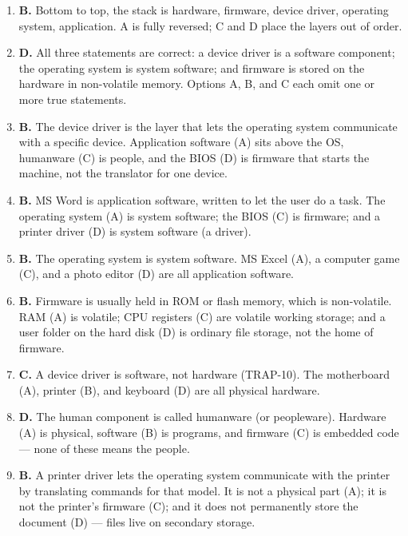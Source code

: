\begin{enumerate}[label=\textbf{Q\arabic*.}, leftmargin=*]
  CPU (hardware).
\item \textbf{B.} Bottom to top, the stack is hardware, firmware, device
  driver, operating system, application. A is fully reversed; C and D place
  the layers out of order.
\item \textbf{D.} All three statements are correct: a device driver is a
  software component; the operating system is system software; and firmware
  is stored on the hardware in non-volatile memory. Options A, B, and C each
  omit one or more true statements.
\item \textbf{B.} The device driver is the layer that lets the operating
  system communicate with a specific device. Application software (A) sits
  above the OS, humanware (C) is people, and the BIOS (D) is firmware that
  starts the machine, not the translator for one device.
\item \textbf{B.} MS Word is application software, written to let the user do
  a task. The operating system (A) is system software; the BIOS (C) is
  firmware; and a printer driver (D) is system software (a driver).
\item \textbf{B.} The operating system is system software. MS Excel (A), a
  computer game (C), and a photo editor (D) are all application software.
\item \textbf{B.} Firmware is usually held in ROM or flash memory, which is
  non-volatile. RAM (A) is volatile; CPU registers (C) are volatile working
  storage; and a user folder on the hard disk (D) is ordinary file storage,
  not the home of firmware.
\item \textbf{C.} A device driver is software, not hardware (TRAP-10). The
  motherboard (A), printer (B), and keyboard (D) are all physical hardware.
\item \textbf{D.} The human component is called humanware (or peopleware).
  Hardware (A) is physical, software (B) is programs, and firmware (C) is
  embedded code --- none of these means the people.
\item \textbf{B.} A printer driver lets the operating system communicate with
  the printer by translating commands for that model. It is not a physical
  part (A); it is not the printer's firmware (C); and it does not permanently
  store the document (D) --- files live on secondary storage.


\end{enumerate}
